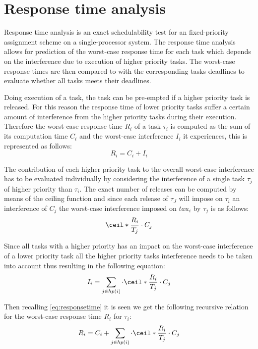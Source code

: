 \section{Response time analysis}
Response time analysis is an exact schedulability test for an fixed-priority  assignment scheme on a single-processor system. 
The response time analysis allows for prediction of the worst-case response time for each task which depends on the interference due to execution of higher priority tasks. 
The worst-case response times are then compared to with the corresponding tasks deadlines to evaluate whether all tasks meets their deadlines. 

Doing execution of a task, the task can be pre-empted if a higher priority task is released. 
For this reason the response time of lower priority tasks suffer a certain amount of interference from the higher priority tasks during their execution. 
Therefore the worst-case response time $R_i$ of a task $\tau_i$ is computed as the sum of its computation time $C_i$ and the worst-case interference $I_i$ it experiences, this is represented as follows:
\begin{equation}\label{eq:responsetime}
R_i = C_i + I_i
\end{equation}

The contribution of each higher priority task to the overall worst-case interference has to be evaluated individually by considering the interference of a single task $\tau_j$ of higher priority than $\tau_i$.
The exact number of releases can be computed by means of the ceiling function and since each release of $\tau_J$ will impose on $\tau_i$ an interference of $C_j$ the worst-case interference imposed on $tau_i$ by $\tau_j$ is as follows:
\begin{equation}
\ceil*{\frac{R_i}{T_j}} \cdot C_j
\end{equation}

Since all tasks with a higher priority has an impact on the worst-case interference of a lower priority task all the higher priority tasks interference needs to be taken into account thus resulting in the following equation:
\begin{equation}
I_i = \sum_{j\in hp(i)} \cdot \ceil*{\frac{R_i}{T_j}} \cdot C_j
\end{equation}

Then recalling \ref{eq:responsetime} it is seen we get the following recursive relation for the worst-case response time $R_i$ for $\tau_i$:
\begin{equation}
R_i = C_i + \sum_{j\in hp(i)} \cdot \ceil*{\frac{R_i}{T_j}} \cdot C_j
\end{equation}

